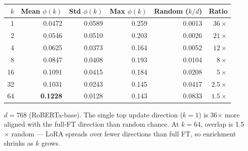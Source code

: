 \begin{tabular}{rrrrrr}
\toprule
\textbf{$k$} & \textbf{Mean $\phi(k)$} & \textbf{Std $\phi(k)$} & \textbf{Max $\phi(k)$} & \textbf{Random ($k/d$)} & \textbf{Ratio} \\
\midrule
 1 & 0.0472 & 0.0589 & 0.259 & 0.0013 & $36\times$ \\
 2 & 0.0546 & 0.0510 & 0.203 & 0.0026 & $21\times$ \\
 4 & 0.0625 & 0.0373 & 0.164 & 0.0052 & $12\times$ \\
 8 & 0.0847 & 0.0408 & 0.193 & 0.0104 & $8\times$ \\
16 & 0.1091 & 0.0415 & 0.184 & 0.0208 & $5\times$ \\
32 & 0.1031 & 0.0243 & 0.145 & 0.0417 & $2.5\times$ \\
64 & \textbf{0.1228} & 0.0128 & 0.143 & 0.0833 & $1.5\times$ \\
\bottomrule
\end{tabular}
\vspace{0.4em}

\noindent\small $d=768$ (RoBERTa-base). The single top update direction ($k=1$) is 36$\times$ more
aligned with the full-FT direction than random chance. At $k=64$, overlap is 1.5$\times$ random ---
LoRA spreads over fewer directions than full FT, so enrichment shrinks as $k$ grows.
